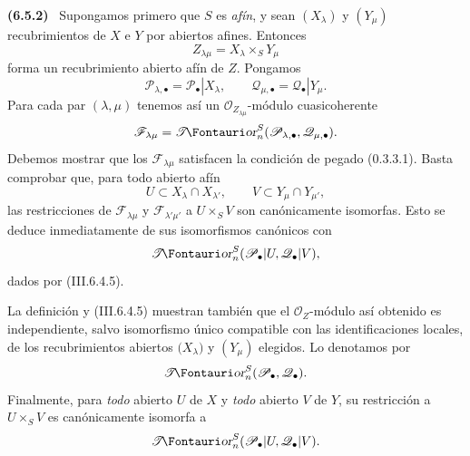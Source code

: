 \documentclass[10pt,oneside]{book}
\makeatletter
\newcommand{\sh}[1]{\mathscr{#1}}
\newcommand*{\ega@sheafop}[3]{\sh{#1}#2\textup{\kern-2.2pt{\Fontauri\slshape #3}}}
\newcommand{\shTor}{\ega@sheafop{T}{}{or}}
\newcommand{\sref}[2][]{\textup{(#2)}}
\newcommand{\oldpage}[2][]{\setcounter{footnote}{0}\marginpar{\scriptsize\textbf{#1}~|~#2}\ignorespaces}
\newenvironment{env}[1][]{\par\medskip\noindent\textbf{(#1)}\ }{\par}
\makeatother
\begin{document}
\begin{env}[6.5.2]
\label{III.6.5.2}
Supongamos primero que $S$ es \emph{afín}, y sean $(X_\lambda)$ y
$(Y_\mu)$ recubrimientos de $X$ e $Y$ por abiertos afines.
Entonces
\[
  Z_{\lambda\mu}=X_\lambda\times_SY_\mu
\]
forma un recubrimiento abierto afín de $Z$. Pongamos
\[
  \sh P_{\lambda,\bullet}=\sh P_\bullet|X_\lambda,
  \qquad
  \sh Q_{\mu,\bullet}=\sh Q_\bullet|Y_\mu.
\]
Para cada par $(\lambda,\mu)$ tenemos así un
$\sh O_{Z_{\lambda\mu}}$-módulo cuasicoherente
\[
  \sh F_{\lambda\mu}
  =
  \boldsymbol{\shTor}_n^S(\sh P_{\lambda,\bullet},\sh Q_{\mu,\bullet}).
\]
Debemos mostrar que los $\sh F_{\lambda\mu}$ satisfacen la
condición de pegado \sref[0]{0.3.3.1}. Basta comprobar que, para
todo abierto afín
\[
  U\subset X_\lambda\cap X_{\lambda'},
  \qquad
  V\subset Y_\mu\cap Y_{\mu'},
\]
las restricciones de $\sh F_{\lambda\mu}$ y
$\sh F_{\lambda'\mu'}$ a $U\times_SV$ son canónicamente
isomorfas. Esto se deduce inmediatamente de sus isomorfismos
canónicos con
\[
  \boldsymbol{\shTor}_n^S(\sh P_\bullet|U,\sh Q_\bullet|V),
\]
dados por \sref{III.6.4.5}.

La definición y \sref{III.6.4.5} muestran también que el
$\sh O_Z$-módulo así obtenido es independiente, salvo isomorfismo
único compatible con las identificaciones locales, de los
recubrimientos abiertos $\boldsymbol{(}X_\lambda)$ y $(Y_\mu)$ elegidos.
\oldpage[III]{149}
Lo denotamos por
\[
  \boldsymbol{\shTor}_n^S(\sh P_\bullet,\sh Q_\bullet).
\]
Finalmente, para \emph{todo} abierto $U$ de $X$ y \emph{todo} abierto $V$ de
$Y$, su restricción a $U\times_SV$ es canónicamente isomorfa a
\[
  \boldsymbol{\shTor}_n^S(\sh P_\bullet|U,\sh Q_\bullet|V).
\]
\end{env}
\end{document}
